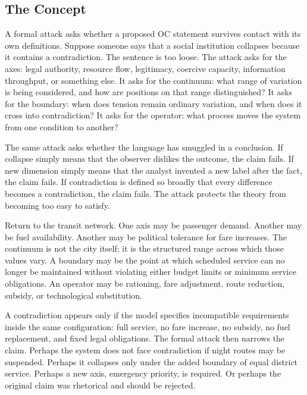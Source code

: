 \documentclass[11pt,a4paper,openany]{book}
\begin{document}
\subsection{The Concept}
A formal attack asks whether a proposed OC statement survives contact with its own definitions. Suppose someone says that a social institution collapses because it contains a contradiction. The sentence is too loose. The attack asks for the axes: legal authority, resource flow, legitimacy, coercive capacity, information throughput, or something else. It asks for the continuum: what range of variation is being considered, and how are positions on that range distinguished? It asks for the boundary: when does tension remain ordinary variation, and when does it cross into contradiction? It asks for the operator: what process moves the system from one condition to another? \cite{kadanoff_scaling,wilson_renormalization}\par
The same attack asks whether the language has smuggled in a conclusion. If collapse simply means that the observer dislikes the outcome, the claim fails. If new dimension simply means that the analyst invented a new label after the fact, the claim fails. If contradiction is defined so broadly that every difference becomes a contradiction, the claim fails. The attack protects the theory from becoming too easy to satisfy.\par
Return to the transit network. One axis may be passenger demand. Another may be fuel availability. Another may be political tolerance for fare increases. The continuum is not the city itself; it is the structured range across which those values vary. A boundary may be the point at which scheduled service can no longer be maintained without violating either budget limits or minimum service obligations. An operator may be rationing, fare adjustment, route reduction, subsidy, or technological substitution.\par
A contradiction appears only if the model specifies incompatible requirements inside the same configuration: full service, no fare increase, no subsidy, no fuel replacement, and fixed legal obligations. The formal attack then narrows the claim. Perhaps the system does not face contradiction if night routes may be suspended. Perhaps it collapses only under the added boundary of equal district service. Perhaps a new axis, emergency priority, is required. Or perhaps the original claim was rhetorical and should be rejected.\par
\end{document}
